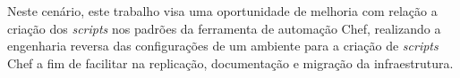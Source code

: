 Neste cenário, este trabalho visa uma oportunidade de melhoria com relação
a criação dos \textit{scripts} nos padrões da ferramenta de automação Chef, realizando
a engenharia reversa das configurações de um ambiente para a criação de \textit{scripts} Chef
a fim de facilitar na replicação, documentação e migração da infraestrutura. %

